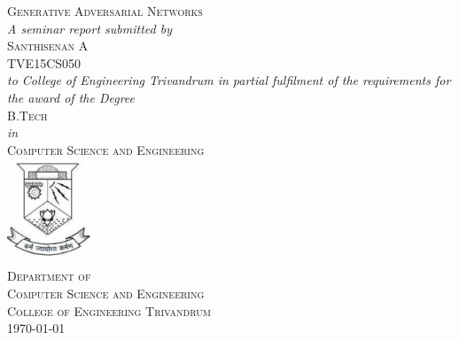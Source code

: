 \documentclass[11pt]{report}
\begin{document}
    \begin{titlepage}
        \newcommand{\HRule}{\rule{\linewidth}{0.5mm}}
        \begin{center}
            \textsc{\LARGE{Generative Adversarial Networks}}\\[0.75cm]
            \textit{A seminar report submitted by} \\[0.25cm]
            \textsc{\Large{Santhisenan A}} \\[0.25cm]
            \textsc{TVE15CS050} \\[0.75cm]
            \textit{to College of Engineering Trivandrum in partial 
            fulfilment of the requirements for the award of the Degree}\\[0.75cm]
            \textsc{\Large B.Tech}\\[0.5cm]
            \textit{in}\\[0.5cm]
            \textsc{\LARGE Computer Science and Engineering}\\[0.75cm]
            \includegraphics[width=2.5cm]{images/emblem.pdf}\\[1cm]

            \textsc{\Large{Department of \\[0.25cm] Computer Science and Engineering}}\\
            [0.75cm]
            \textsc{\large{College of Engineering Trivandrum}}\\[0.75cm]
            \monthyeardate\today

        \end{center}
    \end{titlepage}
\end{document}
